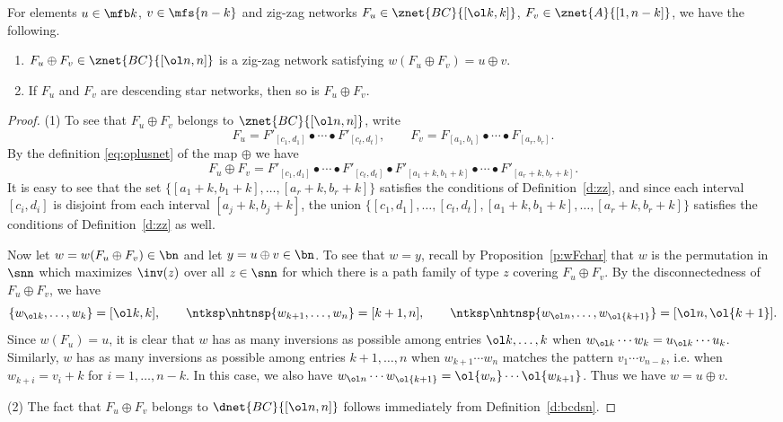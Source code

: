 \begin{lem}\label{l:opluszz}
  For elements $u \in \mfb k$, $v \in \mfs{n-k}$
  and zig-zag networks
  $F_u \in \znet{BC}{[\ol k, k]}$,
  $F_v \in \znet{A}{[1,n-k]}$,
  we have the following.
  \begin{enumerate}
  \item $F_u \oplus F_v \in \znet{BC}{[\ol n, n]}$ is a zig-zag network
    satisfying $w(F_u \oplus F_v) = u \oplus v$.
  \item If $F_u$ and $F_v$ are descending star networks, then so is
    $F_u \oplus F_v$.
  \end{enumerate}
\end{lem}
\begin{proof}
  (1) To see that $F_u \oplus F_v$ belongs to $\znet{BC}{[\ol n, n]}$, write
  \begin{equation*}
      F_u = F'_{[c_1,d_1]} \bullet \cdots \bullet F'_{[c_t,d_t]}, \qquad
      F_v = F_{[a_1,b_1]} \bullet \cdots \bullet F_{[a_r,b_r]}.
  \end{equation*}
  By the definition \eqref{eq:oplusnet} of the map $\oplus$ we have
  \begin{equation*}
    F_u \oplus F_v = F'_{[c_1,d_1]} \bullet \cdots \bullet F'_{[c_t,d_t]}
    \bullet F'_{[a_1+k,b_1+k]} \bullet \cdots \bullet F'_{[a_r+k,b_r+k]}.
  \end{equation*}
  It is easy to see that the set $\{[a_1+k,b_1+k],\dotsc,[a_r+k,b_r+k]\}$
  satisfies the conditions of Definition~\ref{d:zz},
  and since each interval $[c_i,d_i]$ is disjoint
  from each interval $[a_j+k,b_j+k]$, the union
  $\{[c_1,d_1],\dotsc,[c_t,d_t],[a_1+k,b_1+k], \dotsc, [a_r+k,b_r+k]\}$
  satisfies the conditions of Definition~\ref{d:zz} as well.

  Now let $w = w(F_u \oplus F_v) \in \bn$ and let $y = u \oplus v \in \bn$.
  To see that $w = y$,
  recall by Proposition~\ref{p:wFchar}
  that $w$ is the permutation in $\snn$
  which maximizes $\inv(z)$ over all $z \in \snn$
  for which there is a path family of type $z$ covering $F_u \oplus F_v$.
  By the disconnectedness of $F_u \oplus F_v$, we have
  \begin{equation*}
    \{w_{\ol k}, \dotsc, w_k \} = [\ol k, k],
    \qquad
    \ntksp\nhtnsp\{w_{k+1}, \dotsc, w_n \} = [k+1,n],
    \qquad
    \ntksp\nhtnsp\{w_{\ol n}, \dotsc, w_{\ol{k+1}} \} = [\ol n, \ol{k+1}].
  \end{equation*}
  Since $w(F_u) = u$, it is clear that $w$ has as many inversions as possible
  among entries $\ol k, \dotsc, k$ when
  $w_{\ol k} \cdots w_k = u_{\ol k} \cdots u_k$.
  Similarly,
  $w$ has as many inversions as possible
  among entries $k+1, \dotsc, n$ when
  $w_{k+1} \cdots w_n$ matches the pattern $v_1 \cdots v_{n-k}$, i.e.   when $w_{k+i} = v_i + k$ for $i = 1,\dotsc,n-k$.
  In this case,
  we also have
  $w_{\ol n} \cdots w_{\ol{k+1}} = \ol{w_n} \cdots \ol{w_{k+1}}$.
  Thus we have $w = u \oplus v$.

  (2) The fact that $F_u \oplus F_v$ belongs to $\dnet{BC}{[\ol n,n]}$
  follows immediately from Definition~\ref{d:bcdsn}.
\end{proof}


